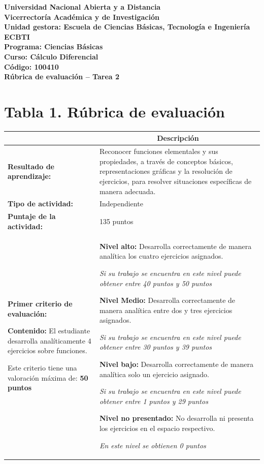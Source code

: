 \documentclass[12pt,letterpaper]{article}
\begin{document}
\begin{center}
\textbf{Universidad Nacional Abierta y a Distancia}\\
\textbf{Vicerrectoría Académica y de Investigación}\\
\textbf{Unidad gestora: Escuela de Ciencias Básicas, Tecnología e Ingeniería ECBTI}\\
\textbf{Programa: Ciencias Básicas}\\
\textbf{Curso: Cálculo Diferencial}\\
\textbf{Código: 100410}\\
\vspace{0.5cm}
\Large\textbf{Rúbrica de evaluación -- Tarea 2}
\end{center}

\section*{Tabla 1. Rúbrica de evaluación}

\begin{tabularx}{\textwidth}{|>{\bfseries}p{4cm}|X|}
\hline
\multicolumn{1}{|c|}{\textbf{Elemento}} & \multicolumn{1}{c|}{\textbf{Descripción}} \\
\hline
Resultado de aprendizaje: & Reconocer funciones elementales y sus propiedades, a través de conceptos básicos, representaciones gráficas y la resolución de ejercicios, para resolver situaciones específicas de manera adecuada. \\
\hline
Tipo de actividad: & Independiente \\
\hline
Puntaje de la actividad: & 135 puntos \\
\hline
\textbf{Primer criterio de evaluación:}

\textbf{Contenido:}
El estudiante desarrolla analíticamente 4 ejercicios sobre funciones.

Este criterio tiene una valoración máxima de: \textbf{50 puntos} & 
\textbf{Nivel alto:} Desarrolla correctamente de manera analítica los cuatro ejercicios asignados.

\textit{Si su trabajo se encuentra en este nivel puede obtener entre 40 puntos y 50 puntos}

\textbf{Nivel Medio:} Desarrolla correctamente de manera analítica entre dos y tres ejercicios asignados.

\textit{Si su trabajo se encuentra en este nivel puede obtener entre 30 puntos y 39 puntos}

\textbf{Nivel bajo:} Desarrolla correctamente de manera analítica solo un ejercicio asignado.

\textit{Si su trabajo se encuentra en este nivel puede obtener entre 1 puntos y 29 puntos}

\textbf{Nivel no presentado:} No desarrolla ni presenta los ejercicios en el espacio respectivo.

\textit{En este nivel se obtienen 0 puntos} \\
\hline
\end{tabularx}
\end{document}
